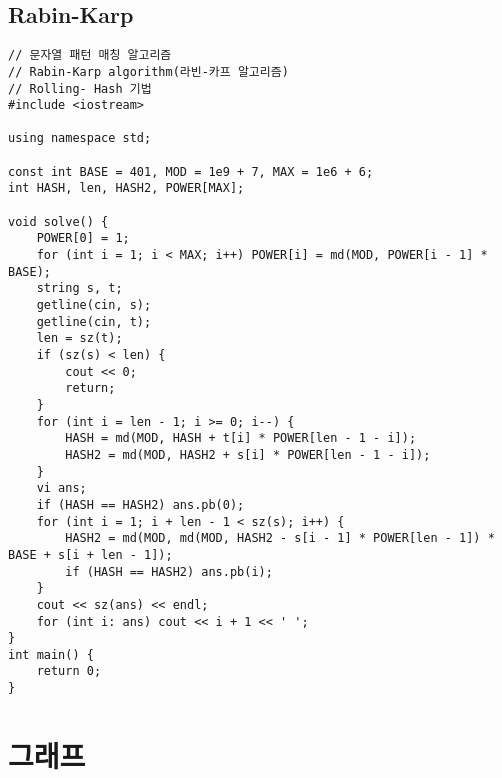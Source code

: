 \documentclass[landscape, 8pt, a4paper, oneside, twocolumn]{extarticle}
\begin{document}
    \subsection{Rabin-Karp}
    \begin{verbatim}
// 문자열 패턴 매칭 알고리즘
// Rabin-Karp algorithm(라빈-카프 알고리즘)
// Rolling- Hash 기법
#include <iostream>

using namespace std;

const int BASE = 401, MOD = 1e9 + 7, MAX = 1e6 + 6;
int HASH, len, HASH2, POWER[MAX];

void solve() {
   	POWER[0] = 1;
   	for (int i = 1; i < MAX; i++) POWER[i] = md(MOD, POWER[i - 1] * BASE);
   	string s, t;
   	getline(cin, s);
   	getline(cin, t);
   	len = sz(t);
   	if (sz(s) < len) {
    	cout << 0;
      	return;
   	}
   	for (int i = len - 1; i >= 0; i--) {
      	HASH = md(MOD, HASH + t[i] * POWER[len - 1 - i]);
      	HASH2 = md(MOD, HASH2 + s[i] * POWER[len - 1 - i]);
   	}
   	vi ans;
   	if (HASH == HASH2) ans.pb(0);
   	for (int i = 1; i + len - 1 < sz(s); i++) {
      	HASH2 = md(MOD, md(MOD, HASH2 - s[i - 1] * POWER[len - 1]) * BASE + s[i + len - 1]);
      	if (HASH == HASH2) ans.pb(i);
   	}
   	cout << sz(ans) << endl;
   	for (int i: ans) cout << i + 1 << ' ';
}
int main() {
	return 0;
}
    \end{verbatim}
    \section{그래프}
\end{document}
